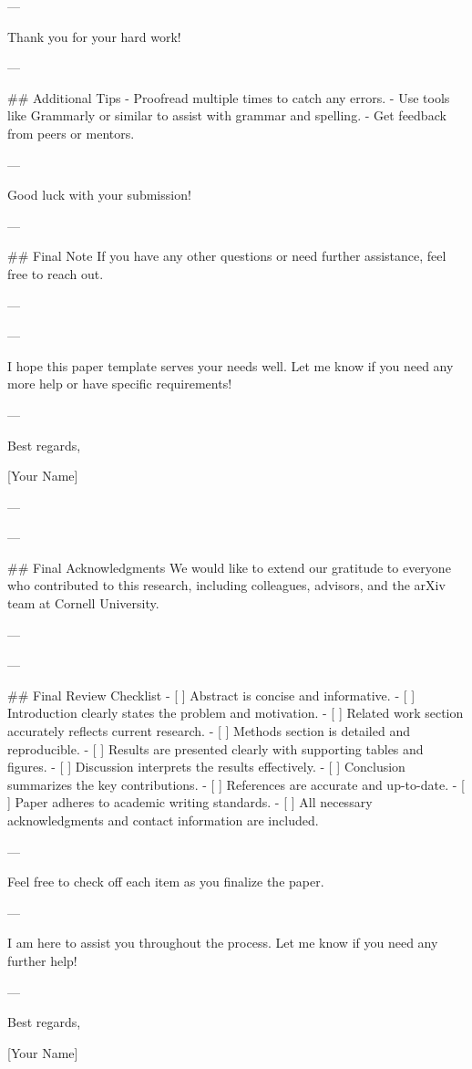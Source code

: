 --- 

Thank you for your hard work! 

--- 

## Additional Tips
- Proofread multiple times to catch any errors.
- Use tools like Grammarly or similar to assist with grammar and spelling.
- Get feedback from peers or mentors.

--- 

Good luck with your submission! 

--- 

## Final Note
If you have any other questions or need further assistance, feel free to reach out. 

--- 

---

I hope this paper template serves your needs well. Let me know if you need any more help or have specific requirements! 

--- 

Best regards, 

[Your Name] 

--- 

---

## Final Acknowledgments
We would like to extend our gratitude to everyone who contributed to this research, including colleagues, advisors, and the arXiv team at Cornell University. 

--- 

---

## Final Review Checklist
- [ ] Abstract is concise and informative.
- [ ] Introduction clearly states the problem and motivation.
- [ ] Related work section accurately reflects current research.
- [ ] Methods section is detailed and reproducible.
- [ ] Results are presented clearly with supporting tables and figures.
- [ ] Discussion interprets the results effectively.
- [ ] Conclusion summarizes the key contributions.
- [ ] References are accurate and up-to-date.
- [ ] Paper adheres to academic writing standards.
- [ ] All necessary acknowledgments and contact information are included.

--- 

Feel free to check off each item as you finalize the paper. 

--- 

I am here to assist you throughout the process. Let me know if you need any further help! 

--- 

Best regards, 

[Your Name] 

